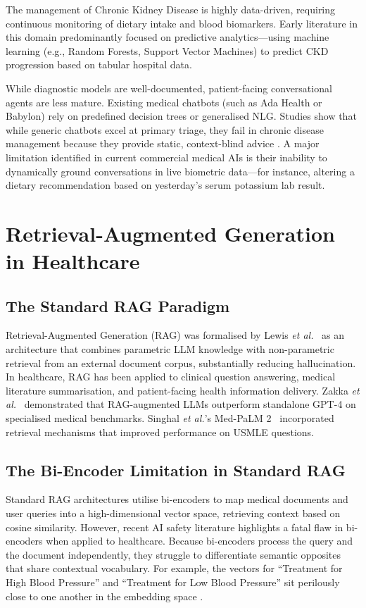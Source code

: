 \documentclass[12pt,a4paper]{report}
\begin{document}
The management of Chronic Kidney Disease is highly data-driven, requiring continuous monitoring of dietary intake and blood biomarkers. Early literature in this domain predominantly focused on predictive analytics---using machine learning (e.g., Random Forests, Support Vector Machines) to predict CKD progression based on tabular hospital data.

While diagnostic models are well-documented, patient-facing conversational agents are less mature. Existing medical chatbots (such as Ada Health or Babylon) rely on predefined decision trees or generalised NLG. Studies show that while generic chatbots excel at primary triage, they fail in chronic disease management because they provide static, context-blind advice \cite{Singhal2023}. A major limitation identified in current commercial medical AIs is their inability to dynamically ground conversations in live biometric data---for instance, altering a dietary recommendation based on yesterday's serum potassium lab result.

\section{Retrieval-Augmented Generation in Healthcare}

\subsection{The Standard RAG Paradigm}

Retrieval-Augmented Generation (RAG) was formalised by Lewis \textit{et al.}~\cite{Lewis2020} as an architecture that combines parametric LLM knowledge with non-parametric retrieval from an external document corpus, substantially reducing hallucination. In healthcare, RAG has been applied to clinical question answering, medical literature summarisation, and patient-facing health information delivery. Zakka \textit{et al.}~\cite{Zakka2024} demonstrated that RAG-augmented LLMs outperform standalone GPT-4 on specialised medical benchmarks. Singhal \textit{et al.}'s Med-PaLM 2~\cite{Singhal2023} incorporated retrieval mechanisms that improved performance on USMLE questions.

\subsection{The Bi-Encoder Limitation in Standard RAG}

Standard RAG architectures utilise bi-encoders to map medical documents and user queries into a high-dimensional vector space, retrieving context based on cosine similarity. However, recent AI safety literature highlights a fatal flaw in bi-encoders when applied to healthcare. Because bi-encoders process the query and the document independently, they struggle to differentiate semantic opposites that share contextual vocabulary. For example, the vectors for ``Treatment for High Blood Pressure'' and ``Treatment for Low Blood Pressure'' sit perilously close to one another in the embedding space \cite{Nogueira2019}.
\end{document}
